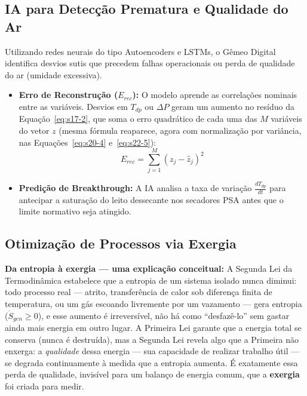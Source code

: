 \documentclass[12pt,a4paper]{article}
\numberwithin{equation}{section}
\numberwithin{table}{section}
\numberwithin{figure}{section}
\begin{document}
{\subsection{IA para Detecção Prematura e Qualidade do Ar}

Utilizando redes neurais do tipo Autoencoders e LSTMs, o Gêmeo Digital identifica desvios sutis que precedem falhas operacionais ou perda de qualidade do ar (umidade excessiva).

\begin{itemize}
	\item \textbf{Erro de Reconstrução ($E_{rec}$):}
	O modelo aprende as correlações nominais entre as variáveis. Desvios em $T_{dp}$ ou $\Delta P$ geram um aumento no resíduo da Equação~\eqref{eq:s17-2}, que soma o erro quadrático de cada uma das $M$ variáveis do vetor $z$ (mesma fórmula reaparece, agora com normalização por variância, nas Equações~\eqref{eq:s20-4} e~\eqref{eq:s22-5}):
	\begin{equation}\label{eq:s17-2}
E_{rec} = \sum_{j=1}^{M} (z_j - \hat{z}_j)^2
\end{equation}
	
	\item \textbf{Predição de Breakthrough:} A IA analisa a taxa de variação $\frac{dT_{dp}}{dt}$ para antecipar a saturação do leito dessecante nos secadores PSA antes que o limite normativo seja atingido.
\end{itemize}

\subsection{Otimização de Processos via Exergia}

\textbf{Da entropia à exergia — uma explicação conceitual:} A Segunda Lei da Termodinâmica estabelece que a entropia de um sistema isolado nunca diminui: todo processo real — atrito, transferência de calor sob diferença finita de temperatura, ou um gás escoando livremente por um vazamento — gera entropia ($\dot{S}_{gen} \ge 0$), e esse aumento é irreversível, não há como ``desfazê-lo'' sem gastar ainda mais energia em outro lugar. A Primeira Lei garante que a energia total se conserva (nunca é destruída), mas a Segunda Lei revela algo que a Primeira não enxerga: a \textit{qualidade} dessa energia — sua capacidade de realizar trabalho útil — se degrada continuamente à medida que a entropia aumenta. É exatamente essa perda de qualidade, invisível para um balanço de energia comum, que a \textbf{exergia} foi criada para medir.

}
\end{document}
